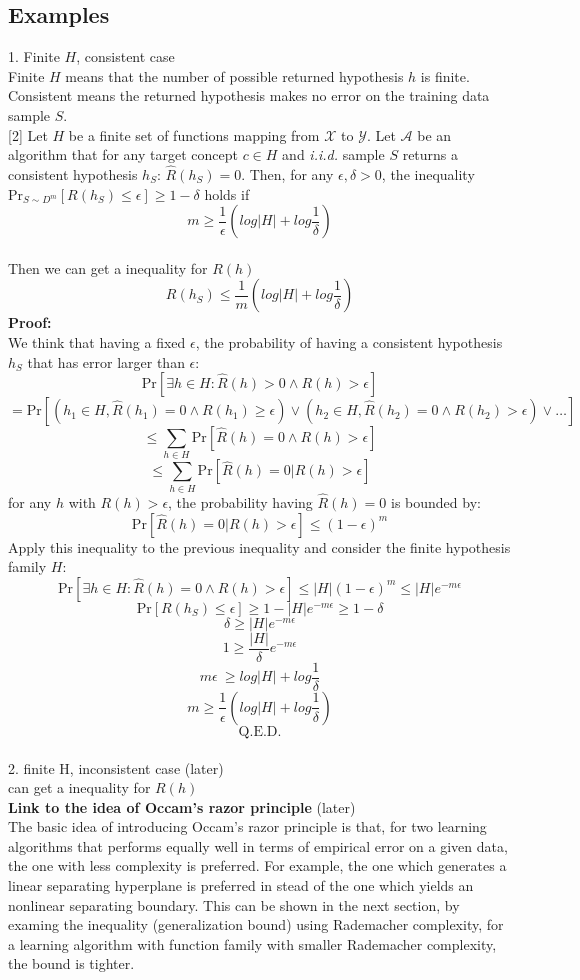 \documentclass[12pt]{article}
\theoremstyle{definition}
\theoremstyle{remark}
\numberwithin{equation}{section}
\begin{document}
\subsection{Examples}
1. Finite $H$, consistent case \\[0.2cm]
Finite $H$ means that the number of possible returned hypothesis $h$ is finite. Consistent means the returned hypothesis makes no error on the training data sample $S$.\\[0.2cm]
[2] Let $H$ be a finite set of functions mapping from $\mathcal{X}$ to $\mathcal{Y}$. Let $\mathcal{A}$ be an algorithm that for any target concept $c \in H$ and \emph{i.i.d.} sample $S$ returns a consistent hypothesis $h_{S}$: $\widehat{R}(h_S) = 0$. Then, for any $\epsilon, \delta > 0$, the inequality $\text{Pr}_{S \sim D^m}[R(h_S) \leq \epsilon] \geq 1-\delta$ holds if
\[m \geq \frac{1}{\epsilon}(log|H|+log\frac{1}{\delta})\] \\[0.2cm]
Then we can get a inequality for $R(h)$
\[R(h_S) \leq \frac{1}{m}(log|H| + log\frac{1}{\delta})\]
\textbf{Proof:}\\[0.2cm]
We think that having a fixed $\epsilon$, the probability of having a consistent hypothesis $h_S$ that has error larger than $\epsilon$:
\[\text{Pr}[\exists h \in H: \widehat{R}(h) > 0  \wedge R(h) > \epsilon]\]
\[= \text{Pr}[(h_1 \in H, \widehat{R}(h_1)=0 \wedge R(h_1) \geq \epsilon) \vee (h_2 \in H, \widehat{R}(h_2) = 0 \wedge R(h_2) > \epsilon) \vee \dots]\]
\[\leq \sum_{h\in H}\text{Pr}[\widehat{R}(h) = 0 \wedge R(h)> \epsilon]\]
\[\leq \sum_{h\in H}\text{Pr}[\widehat{R}(h) = 0 | R(h)> \epsilon]\]
for any $h$ with $R(h) > \epsilon$, the probability having $\widehat{R}(h) = 0$ is bounded by:
\[\text{Pr}[\widehat{R}(h)=0| R(h)>\epsilon] \leq (1-\epsilon)^m\] 
Apply this inequality to the previous inequality and consider the finite hypothesis family $H$:
\[\text{Pr}[\exists h \in H: \widehat{R}(h) = 0 \wedge R(h) > \epsilon] \leq |H|(1-\epsilon)^m \leq |H|e^{-m\epsilon}\]
\[\text{Pr}[R(h_S) \leq \epsilon] \geq 1 - |H|e^{-m\epsilon} \geq 1 - \delta  \]
\[\delta \geq |H|e^{-m\epsilon}\]
\[1 \geq \frac{|H|}{\delta}e^{-m\epsilon}\]
\[m\epsilon\ \geq log|H| + log\frac{1}{\delta}\]
\[m \geq \frac{1}{\epsilon} ( log|H| + log\frac{1}{\delta})\]
\[\text{Q.E.D.}\]\\[0.2cm]
2. finite H, inconsistent case (later) \\[0.2cm]
can get a inequality for $R(h)$ \\[0.2cm]
\textbf{Link to the idea of Occam's razor principle} (later)\\[0.2cm]
The basic idea of introducing Occam's razor principle is that, for two learning algorithms that performs equally well in terms of empirical error on a given data, the one with less complexity is preferred. For example, the one which generates a linear separating hyperplane is preferred in stead of the one which yields an nonlinear separating boundary. This can be shown in the next section, by examing the inequality (generalization bound) using Rademacher complexity, for a learning algorithm with function family with smaller Rademacher complexity, the bound is tighter.
\end{document}
